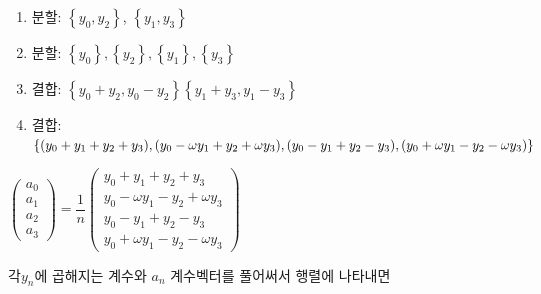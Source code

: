 \begin{enumerate}
    \item 분할: $\left\{y_0, y_2 \right\}$, $\left\{y_1, y_3\right\}$
    \item 분할: $\left\{y_0\right\}, \left\{y_2\right\}, \left\{y_1\right\}, \left\{y_3\right\}$
    \item 결합: $\left\{y_0 + y_2, y_0 - y_2 \right\}\left\{y_1 + y_3, y_1 - y_3\right\}$
    \item 결합: $\left\{(y_0 +y_1 + y_2 + y_3), (y_0 - \omega y_1 + y_2 +\omega y_3) , \\(y_0 - y_1 +y_2 - y_3), (y_0 + \omega y_1 - y_2 - \omega y_3) \right\}$
\end{enumerate}

$
\begin{pmatrix}
    a_0 \\ 
    a_1 \\
    a_2 \\
    a_3 
\end{pmatrix}
= \dfrac{1}{n}
\begin{pmatrix}
    y_0 + y_1 + y_2 + y_3 \\ 
    y_0 - \omega y_1 - y_2 +\omega y_3 \\
    y_0 - y_1 + y_2 - y_3 \\
    y_0 + \omega y_1 - y_2 - \omega y_3
\end{pmatrix}
$


각$y_n$에 곱해지는 계수와 $a_n$ 계수벡터를 풀어써서 행렬에 나타내면


